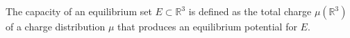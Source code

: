 The capacity of an equilibrium set $E \subset \mathbb{R}^3$ is defined as the total charge $\mu(\mathbb{R}^3)$ of a charge distribution $\mu$ that produces an equilibrium potential for $E$.
